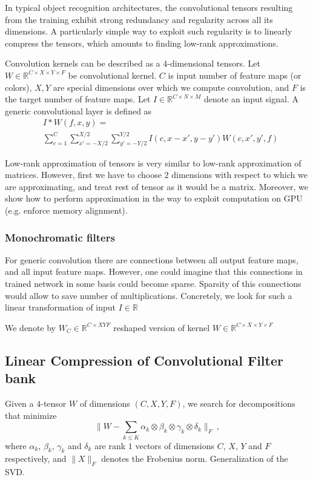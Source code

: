 \documentclass{article}
\begin{document}
In typical object recognition architectures, the convolutional tensors resulting
from the training exhibit strong redundancy and regularity across all its 
dimensions. A particularly simple way to exploit such regularity is to 
linearly compress the tensors, which amounts to finding low-rank 
approximations.

Convolution kernels can be described as a $4$-dimensional tensors. Let $W \in \mathbb{R}^{C \times X \times Y \times F}$ 
be convolutional kernel. 
$C$ is input number of feature maps (or colors), $X, Y$ are special dimensions
over which we compute convolution, and $F$ is the target number of feature maps.
Let $I \in \mathbb{R}^{C \times N \times M}$ denote an input signal.
A generic convolutional layer is defined as
\begin{align*}
\label{convlayereq}
&I \ast W (f,x,y) = \\
&\sum_{c=1}^C \sum_{x'=-X/2}^{X/2} \sum_{y'=-Y/2}^{Y/2} I(c,x-x',y-y') W(c,x',y',f)
\end{align*}

Low-rank approximation of tensors is very similar to low-rank approximation of matrices.
However, first we have to choose $2$ dimensions with respect to which we are approximating, and treat
rest of tensor as it would be a matrix. Moreover, we show how to perform approximation in the way to
exploit computation on GPU (e.g. enforce memory alignment).


\subsubsection{Monochromatic filters}
For generic convolution there are connections between all output feature maps, and all input feature maps.
However, one could imagine that this connections in trained network in some basis could become sparse. 
Sparsity of this connections would allow to save number of multiplications. Concretely, we look for such a 
linear transformation of input $I \in \mathbb{R}$ 




We denote by $W_C \in \mathbb{R}^{C \times XYF}$ reshaped version of kernel $W \in \mathbb{R}^{C \times X \times Y \times F}$


\subsection{Linear Compression of Convolutional Filter bank}

Given a $4$-tensor $W$ of dimensions $(C,X,Y,F)$, we search for decompositions 
that minimize 
\begin{equation}
\label{rankoptim}
\| W - \sum_{k\leq K} \alpha_k \otimes \beta_k \otimes \gamma_k \otimes \delta_k\|_F~,
\end{equation}
where $\alpha_k$, $\beta_k$, $\gamma_k$ and $\delta_k$ are 
rank $1$ vectors of dimensions $C$, $X$, $Y$ and $F$ respectively, and
$\| X \|_F$ denotes the Frobenius norm. Generalization of the SVD.
\end{document}
